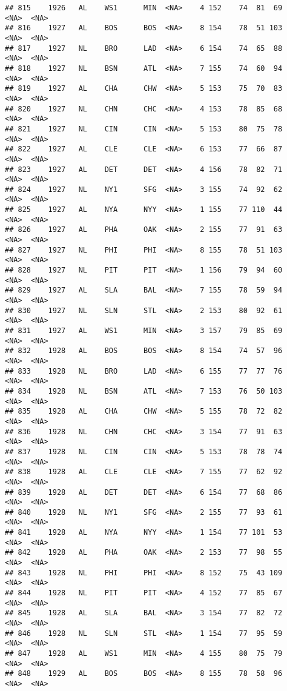 \documentclass[]{article}
\begin{document}
\begin{verbatim}
## 815    1926   AL    WS1      MIN  <NA>    4 152    74  81  69   <NA>  <NA>
## 816    1927   AL    BOS      BOS  <NA>    8 154    78  51 103   <NA>  <NA>
## 817    1927   NL    BRO      LAD  <NA>    6 154    74  65  88   <NA>  <NA>
## 818    1927   NL    BSN      ATL  <NA>    7 155    74  60  94   <NA>  <NA>
## 819    1927   AL    CHA      CHW  <NA>    5 153    75  70  83   <NA>  <NA>
## 820    1927   NL    CHN      CHC  <NA>    4 153    78  85  68   <NA>  <NA>
## 821    1927   NL    CIN      CIN  <NA>    5 153    80  75  78   <NA>  <NA>
## 822    1927   AL    CLE      CLE  <NA>    6 153    77  66  87   <NA>  <NA>
## 823    1927   AL    DET      DET  <NA>    4 156    78  82  71   <NA>  <NA>
## 824    1927   NL    NY1      SFG  <NA>    3 155    74  92  62   <NA>  <NA>
## 825    1927   AL    NYA      NYY  <NA>    1 155    77 110  44   <NA>  <NA>
## 826    1927   AL    PHA      OAK  <NA>    2 155    77  91  63   <NA>  <NA>
## 827    1927   NL    PHI      PHI  <NA>    8 155    78  51 103   <NA>  <NA>
## 828    1927   NL    PIT      PIT  <NA>    1 156    79  94  60   <NA>  <NA>
## 829    1927   AL    SLA      BAL  <NA>    7 155    78  59  94   <NA>  <NA>
## 830    1927   NL    SLN      STL  <NA>    2 153    80  92  61   <NA>  <NA>
## 831    1927   AL    WS1      MIN  <NA>    3 157    79  85  69   <NA>  <NA>
## 832    1928   AL    BOS      BOS  <NA>    8 154    74  57  96   <NA>  <NA>
## 833    1928   NL    BRO      LAD  <NA>    6 155    77  77  76   <NA>  <NA>
## 834    1928   NL    BSN      ATL  <NA>    7 153    76  50 103   <NA>  <NA>
## 835    1928   AL    CHA      CHW  <NA>    5 155    78  72  82   <NA>  <NA>
## 836    1928   NL    CHN      CHC  <NA>    3 154    77  91  63   <NA>  <NA>
## 837    1928   NL    CIN      CIN  <NA>    5 153    78  78  74   <NA>  <NA>
## 838    1928   AL    CLE      CLE  <NA>    7 155    77  62  92   <NA>  <NA>
## 839    1928   AL    DET      DET  <NA>    6 154    77  68  86   <NA>  <NA>
## 840    1928   NL    NY1      SFG  <NA>    2 155    77  93  61   <NA>  <NA>
## 841    1928   AL    NYA      NYY  <NA>    1 154    77 101  53   <NA>  <NA>
## 842    1928   AL    PHA      OAK  <NA>    2 153    77  98  55   <NA>  <NA>
## 843    1928   NL    PHI      PHI  <NA>    8 152    75  43 109   <NA>  <NA>
## 844    1928   NL    PIT      PIT  <NA>    4 152    77  85  67   <NA>  <NA>
## 845    1928   AL    SLA      BAL  <NA>    3 154    77  82  72   <NA>  <NA>
## 846    1928   NL    SLN      STL  <NA>    1 154    77  95  59   <NA>  <NA>
## 847    1928   AL    WS1      MIN  <NA>    4 155    80  75  79   <NA>  <NA>
## 848    1929   AL    BOS      BOS  <NA>    8 155    78  58  96   <NA>  <NA>

\end{verbatim}
\end{document}
